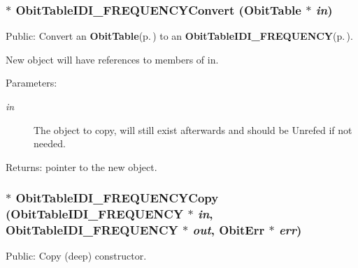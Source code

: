 \subsubsection{$\ast$ Obit\-Table\-IDI\_\-FREQUENCYConvert ({\bf Obit\-Table} $\ast$ {\em in})}\label{ObitTableIDI__FREQUENCY_8h_a16}


Public: Convert an {\bf Obit\-Table}{\rm (p.\,\pageref{structObitTable})} to an {\bf Obit\-Table\-IDI\_\-FREQUENCY}{\rm (p.\,\pageref{structObitTableIDI__FREQUENCY})}. 

New object will have references to members of in. \begin{Desc}
\item[Parameters:]
\begin{description}
\item[{\em in}]The object to copy, will still exist afterwards and should be Unrefed if not needed. \end{description}
\end{Desc}
\begin{Desc}
\item[Returns:]pointer to the new object. \end{Desc}
\subsubsection{$\ast$ Obit\-Table\-IDI\_\-FREQUENCYCopy ({\bf Obit\-Table\-IDI\_\-FREQUENCY} $\ast$ {\em in}, {\bf Obit\-Table\-IDI\_\-FREQUENCY} $\ast$ {\em out}, {\bf Obit\-Err} $\ast$ {\em err})}\label{ObitTableIDI__FREQUENCY_8h_a14}


Public: Copy (deep) constructor. 

